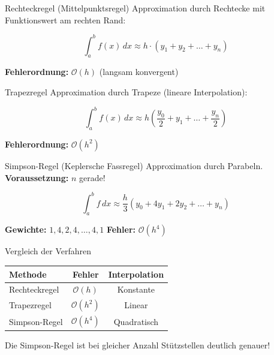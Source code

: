 \documentclass[a4paper,fontsize = 7pt]{scrartcl}
\renewcommand*{\arraystretch}{2}
\begin{document}
\begin{mainbox}{Rechteckregel (Mittelpunktsregel)}
Approximation durch Rechtecke mit Funktionswert am rechten Rand:

$$\int_a^b f(x)\,dx \approx h \cdot (y_1 + y_2 + \ldots + y_n)$$

\textbf{Fehlerordnung:} $\mathcal{O}(h)$ (langsam konvergent)
\end{mainbox}

\begin{mainbox}{Trapezregel}
Approximation durch Trapeze (lineare Interpolation):

$$\int_a^b f(x)\,dx \approx h \left(\frac{y_0}{2} + y_1 + \ldots + \frac{y_n}{2}\right)$$

\textbf{Fehlerordnung:} $\mathcal{O}(h^2)$
\end{mainbox}

\begin{mainbox}{Simpson-Regel (Keplersche Fassregel)}
Approximation durch Parabeln. \textbf{Voraussetzung:} $n$ gerade!

$$\int_a^b f\,dx \approx \frac{h}{3}(y_0 + 4y_1 + 2y_2 + \ldots + y_n)$$

\textbf{Gewichte:} $1, 4, 2, 4, \ldots, 4, 1$ \quad \textbf{Fehler:} $\mathcal{O}(h^4)$
\end{mainbox}

\begin{subbox}{Vergleich der Verfahren}
\renewcommand*{\arraystretch}{1.4}
\begin{center}
\begin{tabular}{l|c|c}
\textbf{Methode} & \textbf{Fehler} & \textbf{Interpolation} \\
\hline
Rechteckregel & $\mathcal{O}(h)$ & Konstante \\
Trapezregel & $\mathcal{O}(h^2)$ & Linear \\
Simpson-Regel & $\mathcal{O}(h^4)$ & Quadratisch \\
\end{tabular}
\end{center}

Die Simpson-Regel ist bei gleicher Anzahl Stützstellen deutlich genauer!
\end{subbox}
\end{document}
